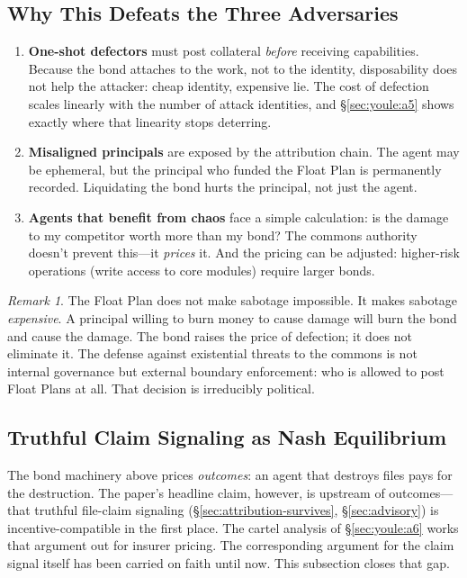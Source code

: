\documentclass[11pt,a4paper]{article}
\theoremstyle{definition}
\theoremstyle{remark}
\newtheorem*{remark}{Remark}
\begin{document}
\subsection{Why This Defeats the Three Adversaries}


\begin{enumerate}
  \item \textbf{One-shot defectors} must post collateral \emph{before} receiving capabilities. Because the bond attaches to the work, not to the identity, disposability does not help the attacker: cheap identity, expensive lie. The cost of defection scales linearly with the number of attack identities, and \S\ref{sec:youle:a5} shows exactly where that linearity stops deterring.

  \item \textbf{Misaligned principals} are exposed by the attribution chain. The agent may be ephemeral, but the principal who funded the Float Plan is permanently recorded. Liquidating the bond hurts the principal, not just the agent.

  \item \textbf{Agents that benefit from chaos} face a simple calculation: is the damage to my competitor worth more than my bond? The commons authority doesn't prevent this---it \emph{prices} it. And the pricing can be adjusted: higher-risk operations (write access to core modules) require larger bonds.
\end{enumerate}

\begin{remark}
The Float Plan does not make sabotage impossible. It makes sabotage \emph{expensive}. A principal willing to burn money to cause damage will burn the bond and cause the damage. The bond raises the price of defection; it does not eliminate it. The defense against existential threats to the commons is not internal governance but external boundary enforcement: who is allowed to post Float Plans at all. That decision is irreducibly political.
\end{remark}

\subsection{Truthful Claim Signaling as Nash Equilibrium}\label{sec:claim-signaling-ic}

The bond machinery above prices \emph{outcomes}: an agent that destroys files pays for the destruction. The paper's headline claim, however, is upstream of outcomes---that truthful file-claim signaling (\S\ref{sec:attribution-survives}, \S\ref{sec:advisory}) is incentive-compatible in the first place. The cartel analysis of \S\ref{sec:youle:a6} works that argument out for insurer pricing. The corresponding argument for the claim signal itself has been carried on faith until now. This subsection closes that gap.
\end{document}

